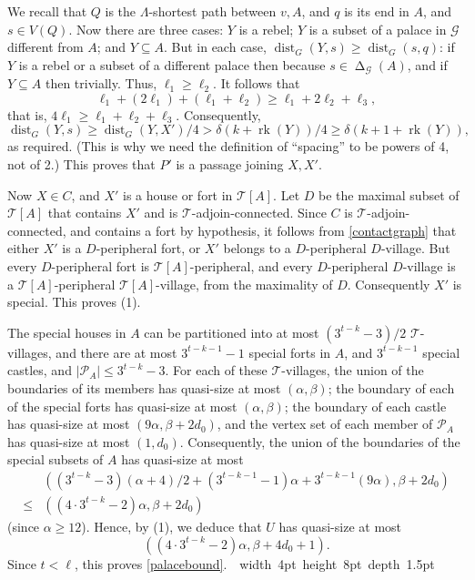 \documentclass[titlepage,11pt]{article}
\newcommand\blackslug{\hbox{\hskip 1pt \vrule width 4pt height 8pt depth 1.5pt
		\hskip 1pt}}
\newcommand\bbox{\hfill \quad \blackslug \bigbreak}
\newcommand{\dist}{\operatorname{dist}}
\newcommand{\voro}{\operatorname{\Delta}}
\newcommand{\rk}{\operatorname{rk}}
\newcommand{\mac}{\mathcal}
\begin{document}
	We recall that $Q$ is the $\Lambda$-shortest path between $v,A$, and $q$ is its end in $A$, and $s\in V(Q)$.
	Now there are three cases: $Y$ is a rebel; $Y$ is a subset of a palace in $\mac G$ different from $A$; and
	$Y\subseteq A$. But in each case, $\dist_G(Y,s)\ge \dist_G(s,q)$: if $Y$ is a rebel or a subset of a   
	different palace then because $s\in \voro_{\mac G}(A)$, and if $Y\subseteq A$ then trivially.
	Thus, $\ell_1\ge \ell_2$. 
	It follows that 
	$$\ell_1 + (2\ell_1)+ (\ell_1+\ell_2) \ge \ell_1+ 2\ell_2+ \ell_3,$$
	that is, $4\ell_1\ge \ell_1+\ell_2+\ell_3$. Consequently, 
	$$\dist_G(Y,s)\ge \dist_G(Y,X')/4> \delta(k+\rk(Y))/4\ge \delta(k+1+\rk(Y)),$$
	as required. (This is why we need the definition of ``spacing'' to be powers of 4, not of 2.)
	This proves that $P'$ is a passage joining $X,X'$.
	
	Now $X\in C$, and $X'$ is a house or fort in $\mac T[A]$. Let $D$ be the maximal subset of $\mac T[A]$ that contains $X'$ and is 
	$\mac T$-adjoin-connected. Since $C$ is $\mac T$-adjoin-connected, and contains a fort by hypothesis, 
	it follows from 
	\ref{contactgraph} that
	either $X'$
	is a $D$-peripheral fort, or $X'$ belongs to a $D$-peripheral $D$-village.
	But every $D$-peripheral fort is $\mac T[A]$-peripheral,
	and every $D$-peripheral $D$-village is a $\mac T[A]$-peripheral $\mac T[A]$-village, from the maximality of $D$. Consequently
	$X'$ is special.  
	This proves (1).
	
	
	\bigskip
	
	The special houses in $A$ can be partitioned into
	at most $(3^{t-k}-3)/2$ $\mac T$-villages, and there are at most $3^{t-k-1}-1$ special forts in $A$, and $3^{t-k-1}$ special castles,
	and $|\mac P_A|\le 3^{t-k}-3$.
	For each of these $\mac T$-villages,
	the union of the boundaries of its members has quasi-size at most $(\alpha,\beta)$; the boundary of each of the special forts has quasi-size at most 
	$(\alpha,\beta)$;
	the boundary of each castle has quasi-size at most $(9\alpha, \beta+2d_0)$, and the vertex set of each member of $\mac P_A$ 
	has quasi-size at most $(1,d_0)$. 
	Consequently, the union of the boundaries of the
	special subsets of $A$ has quasi-size at most
	\begin{align*}
		&\left(\left(3^{t-k}-3\right)(\alpha+4)/2+ \left(3^{t-k-1}-1\right)\alpha+ 3^{t-k-1}(9\alpha), \beta+2d_0\right)\\
		\le &
		\left(\left(4\cdot 3^{t-k}-2\right)\alpha,\beta+2d_0\right)
	\end{align*}
	(since $\alpha\ge 12$).
	Hence, by (1), we deduce that $U$ has quasi-size at most
	$$\left(\left(4\cdot 3^{t-k}-2\right)\alpha,\beta+4d_0+1\right).$$
	Since $t<\ell$, this proves \ref{palacebound}.~\bbox
	
\end{document}
